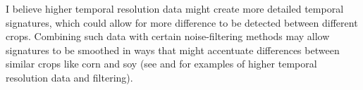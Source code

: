 I believe higher temporal resolution data might create more detailed temporal signatures, which could allow for more difference to be detected between different crops. Combining such data with certain noise-filtering methods may allow signatures to be smoothed in ways that might accentuate differences between similar crops like corn and soy (see \textcite{doraiswamy2006improved} and \textcite{sakamoto2010a-two-step} for examples of higher temporal resolution data and filtering).